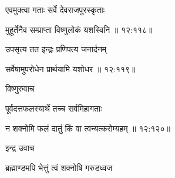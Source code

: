 {\devanagarifont एवमुक्त्वा गताः सर्वे देवराजपुरस्कृताः \thinspace{\dandab} \dontdisplaylinenum }%


{\devanagarifont मुहूर्तेनैव सम्प्राप्ता विष्णुलोकं यशस्विनि {॥ १२:११८॥} \veg\dontdisplaylinenum }%

{\devanagarifont उपसृत्य तत इन्द्रः प्रणिपत्य जनार्दनम् \thinspace{\dandab} \dontdisplaylinenum }%
 

{\devanagarifont सर्वेषामुपरोधेन प्रार्थयामि यशोधर {॥ १२:११९॥} \veg\dontdisplaylinenum }%

{\devanagarifont विष्णुरुवाच {\dandab}\dontdisplaylinenum  }%

{\devanagarifont पूर्वदत्तफलस्यार्थे तच्च सर्वमिहागताः \thinspace{\danda} \dontdisplaylinenum }%


{\devanagarifont न शक्नोमि फलं दातुं किं वा त्वन्यत्करोम्यहम् {॥ १२:१२०॥} \veg\dontdisplaylinenum }%

{\devanagarifont इन्द्र उवाच {\dandab}\dontdisplaylinenum  }%
 
{\devanagarifont ब्रह्माण्डमपि भेत्तुं त्वं शक्नोषि गरुडध्वज \thinspace{\danda} \dontdisplaylinenum }%



